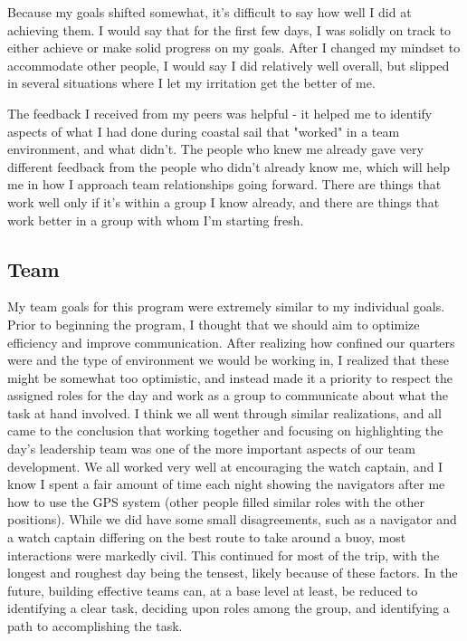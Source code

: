 \documentclass[12pt]{article}
\begin{document}
Because my goals shifted somewhat, it's difficult to say how well I did at achieving them. I would say that for the first few days, I was solidly on track to either achieve or make solid progress on my goals. After I changed my mindset to accommodate other people, I would say I did relatively well overall, but slipped in several situations where I let my irritation get the better of me.

The feedback I received from my peers was helpful - it helped me to identify aspects of what I had done during coastal sail that "worked" in a team environment, and what didn't. The people who knew me already gave very different feedback from the people who didn't already know me, which will help me in how I approach team relationships going forward. There are things that work well only if it's within a group I know already, and there are things that work better in a group with whom I'm starting fresh. 

\subsection*{Team}
\label{sec:org73bf2e4}
My team goals for this program were extremely similar to my individual goals. Prior to beginning the program, I thought that we should aim to optimize efficiency and improve communication. After realizing how confined our quarters were and the type of environment we would be working in, I realized that these might be somewhat too optimistic, and instead made it a priority to respect the assigned roles for the day and work as a group to communicate about what the task at hand involved. I think we all went through similar realizations, and all came to the conclusion that working together and focusing on highlighting the day's leadership team was one of the more important aspects of our team development. We all worked very well at encouraging the watch captain, and I know I spent a fair amount of time each night showing the navigators after me how to use the GPS system (other people filled similar roles with the other positions). While we did have some small disagreements, such as a navigator and a watch captain differing on the best route to take around a buoy, most interactions were markedly civil. This continued for most of the trip, with the longest and roughest day being the tensest, likely because of these factors. In the future, building effective teams can, at a base level at least, be reduced to identifying a clear task, deciding upon roles among the group, and identifying a path to accomplishing the task. 
\end{document}
